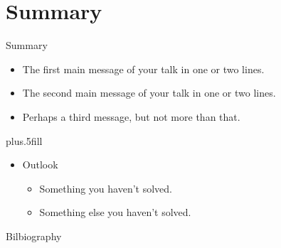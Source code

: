 \documentclass[usenames,dvipsnames]{beamer}
\begin{document}
\section*{Summary}

\begin{frame}{Summary}
  \begin{itemize}
  \item
    The \alert{first main message} of your talk in one or two lines.
  \item
    The \alert{second main message} of your talk in one or two lines.
  \item
    Perhaps a \alert{third message}, but not more than that.
  \end{itemize}
  
  \vskip0pt plus.5fill
  \begin{itemize}
  \item
    Outlook
    \begin{itemize}
    \item
      Something you haven't solved.
    \item
      Something else you haven't solved.
    \end{itemize}
  \end{itemize}
\end{frame}


\begin{frame}[allowframebreaks]{Bilbiography}
  
  
\end{frame}
\end{document}
